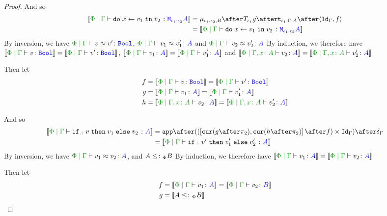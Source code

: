 \documentclass{report}
\begin{document}
\begin{framed}
\begin{proof}
        
        
        And so
        \begin{equation}
            \begin{split}
                \deno{\gpetyperelation{\doin{x}{v_1}{v_2}}{\M{\e_1\dot\e_2}{A}}} & = \bind{\e_1}{\e_2}{B} \after \T{\e_1}{g} \after \tstrength{\e_1}{\G}{A} \after \pr{\idg}{f}\\
                 & = \deno{\gpetyperelation{\doin{x}{v_1}{v_2}}{\M{\e_1\dot\e_2}{A}}}
            \end{split}
        \end{equation}
        By inversion, we have $\gpeberelation{v}{v'}{\B}$, $\gpeberelation{v_1}{v_1'}{A}$ and $\gpeberelation{v_2}{v_2'}{A}$
        By induction, we therefore have $\deno{\gpetyperelation{v}{\B}} = \deno{\gpetyperelation{v'}{\B}}$, $\deno{\gpetyperelation{v_1}{A}}= \deno{\gpetyperelation{v_1'}{A}}$ and $\deno{\etyperelation{\P}{\gax}{v_2}{A}} = \deno{\etyperelation{\P}{\gax}{v_2'}{A}}$
        
        Then let
        \begin{align*}
            f &{}=\deno{\gpetyperelation{v}{\B}} = \deno{\gpetyperelation{v'}{\B}}\\
            g &{}=\deno{\gpetyperelation{v_1}{A}}= \deno{\gpetyperelation{v_1'}{A}}\\
            h &{}=\deno{\etyperelation{\P}{\gax}{v_2}{A}} = \deno{\etyperelation{\P}{\gax}{v_2'}{A}}
        \end{align*}
        
        
        
        And so
        \begin{equation}
            \begin{split}
                \deno{\gpetyperelation{\pifthenelse{A}{v}{v_1}{v_2}}{A}} & = \ifMorph{f}{g}{h}\\
                 & = \deno{\gpetyperelation{\pifthenelse{A}{v'}{v_1'}{v_2'}}{A}}
            \end{split}
        \end{equation}
        By inversion, we have $\gpeberelation{v_1}{v_2}{A}$, and $A \leq\colon_\Phi B$ 
        By induction, we therefore have $\deno{\gpetyperelation{v_1}{A}} = \deno{\gpetyperelation{v_2}{A}}$
        
        Then let
        \begin{align*}
            f &{}=\deno{\gpetyperelation{v_1}{A}} = \deno{\gpetyperelation{v_2}{B}}\\
            g &{}=\deno{A \subtypep B}
        \end{align*}
        

\end{proof}
\end{framed}
\end{document}
